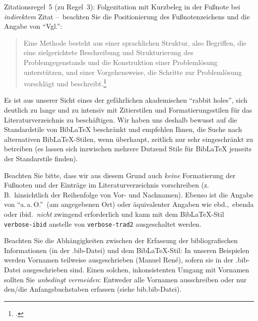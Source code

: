 


Zitationsregel~5 (zu Regel~3): Folgezitation mit Kurzbeleg in der Fußnote bei \emph{indirektem} Zitat --~beachten Sie die Positionierung des Fußnotenzeichens  und die Angabe von \enquote{Vgl.}:

\begin{quote}
Eine Methode besteht aus einer sprachlichen Struktur, also Begriffen, die eine zielgerichtete Beschreibung und Strukturierung des Problemgegenstands und die Konstruktion einer Problemlösung unterstützen, und einer Vorgehensweise, die Schritte zur Problemlösung vorschlägt und beschreibt.\footcite[Vgl.][S.~161f.]{Fran07Konfig}
\end{quote}


Es ist aus unserer Sicht eines der gefährlichen akademischen \enquote{rabbit holes}, sich deutlich zu lange und zu intensiv mit Zitierstilen und Formatierungsstilen für das Literaturverzeichnis zu beschäftigen. Wir haben uns deshalb bewusst auf die Standardstile von BibLaTeX beschränkt und empfehlen Ihnen, die Suche nach alternativen BibLaTeX-Stilen, wenn überhaupt, zeitlich nur sehr eingeschränkt zu betreiben (es lassen sich inzwischen mehrere Dutzend Stile für BibLaTeX jenseits der Standarstile finden). 

\begin{shaded}
Beachten Sie bitte, dass wir aus diesem Grund auch \emph{keine} Formatierung der Fußnoten und der Einträge im Literaturverzeichnis vorschreiben (z.\,B.\ hinsichtlich der   Reihenfolge von Vor- und Nachnamen).
%
Ebenso ist die Angabe von \enquote{a.\,a.\,O.}\ (am angegebenen Ort) oder äquivalenter Angaben wie ebd.,\ ebenda oder ibid.\ \emph{nicht} zwingend erforderlich und kann mit dem BibLaTeX-Stil \verb|verbose-ibid| anstelle von \verb|verbose-trad2| ausgeschaltet werden.
%
\end{shaded}


Beachten Sie die Abhängigkeiten zwischen der Erfassung der bibliografischen Informationen (in der .bib-Datei) und dem BibLaTeX-Stil: In unseren Beispielen werden Vornamen teilweise ausgeschrieben (Manuel René), sofern sie in der .bib-Datei ausgeschrieben sind. Einen solchen, inkonsistenten Umgang mit Vornamen sollten Sie \emph{unbedingt vermeiden}: Entweder alle Vornamen ausschreiben oder nur den/die Anfangsbuchstaben erfassen (siehe bib.bib-Datei). 


